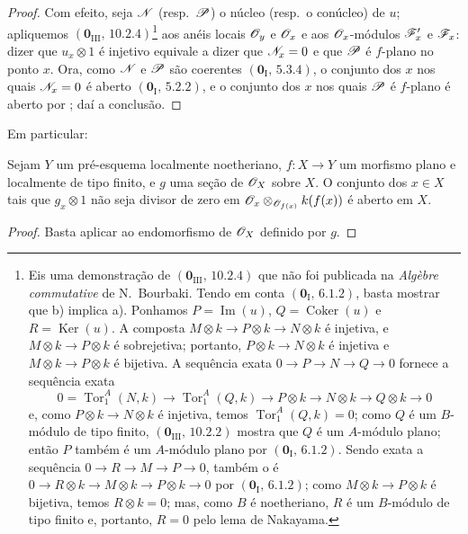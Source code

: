 \begin{proof}
Com efeito, seja $\mathscr{N}$ (resp.\ $\mathscr{P}$) o núcleo (resp.\ o conúcleo) de $u$; apliquemos $(\mathbf 0_{\mathrm{III}},\,10.2.4)$\footnote{Eis uma demonstração de $(\mathbf 0_{\mathrm{III}},\,10.2.4)$ que não foi publicada na \emph{Algèbre commutative} de N.~Bourbaki. Tendo em conta $(\mathbf 0_{\mathrm I},\,6.1.2)$, basta mostrar que b) implica a). Ponhamos $P=\operatorname{Im}(u)$, $Q=\operatorname{Coker}(u)$ e $R=\operatorname{Ker}(u)$. A composta $M\otimes k\to P\otimes k\to N\otimes k$ é injetiva, e $M\otimes k\to P\otimes k$ é sobrejetiva; portanto, $P\otimes k\to N\otimes k$ é injetiva e $M\otimes k\to P\otimes k$ é bijetiva. A sequência exata $0\to P\to N\to Q\to0$ fornece a sequência exata
\[
  0=\operatorname{Tor}_1^A(N,k)\to\operatorname{Tor}_1^A(Q,k)
  \to P\otimes k\to N\otimes k\to Q\otimes k\to0
\]
e, como $P\otimes k\to N\otimes k$ é injetiva, temos $\operatorname{Tor}_1^A(Q,k)=0$; como $Q$ é um $B$-módulo de tipo finito, $(\mathbf 0_{\mathrm{III}},\,10.2.2)$ mostra que $Q$ é um $A$-módulo plano; então $P$ também é um $A$-módulo plano por $(\mathbf 0_{\mathrm I},\,6.1.2)$. Sendo exata a sequência $0\to R\to M\to P\to0$, também o é $0\to R\otimes k\to M\otimes k\to P\otimes k\to0$ por $(\mathbf 0_{\mathrm I},\,6.1.2)$; como $M\otimes k\to P\otimes k$ é bijetiva, temos $R\otimes k=0$; mas, como $B$ é noetheriano, $R$ é um $B$-módulo de tipo finito e, portanto, $R=0$ pelo lema de Nakayama.} aos anéis locais $\mathscr{O}_y$ e $\mathscr{O}_x$ e aos $\mathscr{O}_x$-módulos $\mathscr{F}'_x$ e $\mathscr{F}_x$: dizer que $u_x\otimes1$ é injetivo equivale a dizer que $\mathscr{N}_x=0$ e que $\mathscr{P}$ é $f$-plano no ponto $x$. Ora, como $\mathscr{N}$ e $\mathscr{P}$ são coerentes $(\mathbf 0_{\mathrm I},\,5.3.4)$, o conjunto dos $x$ nos quais $\mathscr{N}_x=0$ é aberto $(\mathbf 0_{\mathrm I},\,5.2.2)$, e o conjunto dos $x$ nos quais $\mathscr{P}$ é $f$-plano é aberto por ; daí a conclusão.
\end{proof}

Em particular:

\begin{corollary}[11.1.3]
\label{IV.11.1.3}
Sejam $Y$ um pré-esquema localmente noetheriano, $f:X\to Y$ um morfismo plano e localmente de tipo finito, e $g$ uma seção de $\mathscr{O}_X$ sobre $X$. O conjunto dos $x\in X$ tais que $g_x\otimes1$ não seja divisor de zero em $\mathscr{O}_x\otimes_{\mathscr{O}_{f(x)}}k(f(x))$ é aberto em $X$.
\end{corollary}

\begin{proof}
Basta aplicar  ao endomorfismo de $\mathscr{O}_X$ definido por $g$.
\end{proof}

